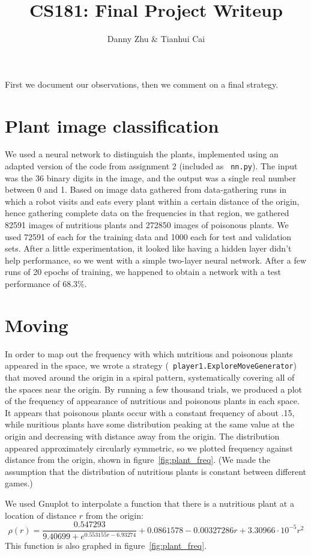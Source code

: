 \documentclass{article}
\title{CS181: Final Project Writeup}
\author{Danny Zhu \& Tianhui Cai}
\begin{document}
\maketitle
First we document our observations, then we comment on
a final strategy.

\section{Plant image classification}
We used a neural network to distinguish the plants, implemented using
an adapted version of the code from assignment 2 (included as {\tt
  nn.py}). The input was the 36 binary digits in the image, and the
output was a single real number between 0 and 1.  Based on image data
gathered from data-gathering runs in which a robot visits and eats
every plant within a certain distance of the origin, hence gathering
complete data on the frequencies in that region, we gathered 82591
images of nutritious plants and 272850 images of poisonous plants. We
used 72591 of each for the training data and 1000 each for test and
validation sets. After a little experimentation, it looked like having
a hidden layer didn't help performance, so we went with a simple
two-layer neural network. After a few runs of 20 epochs of training,
we happened to obtain a network with a test performance of $68.3\%$.


\section{Moving}
\label{sec:moving}
In order to map out the frequency with which nutritious and poisonous
plants appeared in the space, we wrote a strategy ({\tt
  player1.ExploreMoveGenerator}) that moved around the origin in a
spiral pattern, systematically covering all of the spaces near the
origin. By running a few thousand trials, we produced a plot of the
frequency of appearance of nutritious and poisonous plants in each
space. It appears that poisonous plants occur with a constant
frequency of about .15, while nuritious plants have some distribution
peaking at the same value at the origin and decreasing with distance
away from the origin. The distribution appeared approximately
circularly symmetric, so we plotted frequency against distance from
the origin, shown in figure~\ref{fig:plant_freq}. (We made the
assumption that the distribution of nutritious plants is constant
between different games.)

We used Gnuplot to interpolate a function that there is a nutritious
plant at a location of distance $r$ from the origin:
\[\rho(r)=\frac{0.547293}{9.40699+e^{0.553155r-6.93274}}+0.0861578-0.00327286r+3.30966\cdot10^{-5}r^2\]
This function is also graphed in figure~\ref{fig:plant_freq}.
\end{document}
